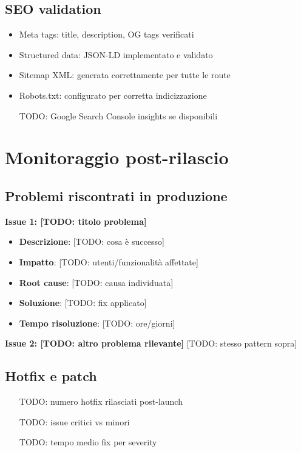 \subsection{SEO validation}
\begin{itemize}
  \item Meta tags: title, description, OG tags verificati
  \item Structured data: JSON-LD implementato e validato
  \item Sitemap XML: generata correttamente per tutte le route
  \item Robots.txt: configurato per corretta indicizzazione
  \item [TODO: Google Search Console insights se disponibili]
\end{itemize}

\section{Monitoraggio post-rilascio}
\subsection{Problemi riscontrati in produzione}
\textbf{Issue 1: [TODO: titolo problema]}
\begin{itemize}
  \item \textbf{Descrizione}: [TODO: cosa è successo]
  \item \textbf{Impatto}: [TODO: utenti/funzionalità affettate]
  \item \textbf{Root cause}: [TODO: causa individuata]
  \item \textbf{Soluzione}: [TODO: fix applicato]
  \item \textbf{Tempo risoluzione}: [TODO: ore/giorni]
\end{itemize}

\textbf{Issue 2: [TODO: altro problema rilevante]}
[TODO: stesso pattern sopra]

\subsection{Hotfix e patch}
\begin{itemize}
  \item [TODO: numero hotfix rilasciati post-launch]
  \item [TODO: issue critici vs minori]
  \item [TODO: tempo medio fix per severity]
\end{itemize}

